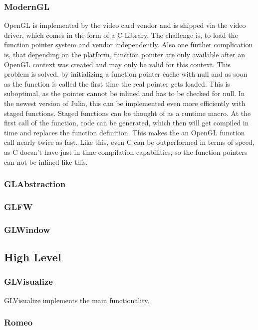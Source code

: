 \subsubsection{ModernGL}
OpenGL is implemented by the video card vendor and is shipped via the video driver, which comes in the form of a C-Library.
The challenge is, to load the function pointer system and vendor independently. Also one further complication is, that depending on the platform, function pointer are only available after an OpenGL context was created and may only be valid for this context. \cite{wgl}
This problem is solved, by initializing a function pointer cache with null and as soon as the function is called the first time the real pointer gets loaded. This is suboptimal, as the pointer cannot be inlined and has to be checked for null.
In the newest version of Julia, this can be implemented even more efficiently with staged functions. Staged functions can be thought of as a runtime macro.
At the first call of the function, code can be generated, which then will get compiled in time and replaces the function definition. 
This makes the an OpenGL function call nearly twice as fast.
Like this, even C can be outperformed in terms of speed, as C doesn't have just in time compilation capabilities, so the function pointers can not be inlined like this.


\subsubsection{GLAbstraction}


\subsubsection{GLFW}
\subsubsection{GLWindow}

\subsection{High Level}

\subsubsection{GLVisualize}
GLVisualize implements the main functionality.

\subsubsection{Romeo}
